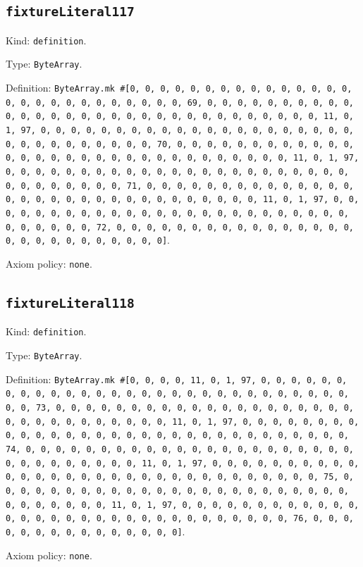 \documentclass[11pt]{article}
\begin{document}
\subsection*{\texttt{fixtureLiteral117}}
\noindent Kind: \texttt{definition}.\par
\noindent Type: \texttt{ByteArray}.\par
\noindent Definition: \texttt{ByteArray.mk \#[0, 0, 0, 0, 0, 0, 0, 0, 0, 0, 0, 0, 0, 0, 0, 0, 0, 0, 0, 0, 0, 0, 0, 0, 0, 0, 0, 69, 0, 0, 0, 0, 0, 0, 0, 0, 0, 0, 0, 0, 0, 0, 0, 0, 0, 0, 0, 0, 0, 0, 0, 0, 0, 0, 0, 0, 0, 0, 0, 11, 0, 1, 97, 0, 0, 0, 0, 0, 0, 0, 0, 0, 0, 0, 0, 0, 0, 0, 0, 0, 0, 0, 0, 0, 0, 0, 0, 0, 0, 0, 0, 0, 0, 0, 70, 0, 0, 0, 0, 0, 0, 0, 0, 0, 0, 0, 0, 0, 0, 0, 0, 0, 0, 0, 0, 0, 0, 0, 0, 0, 0, 0, 0, 0, 0, 0, 11, 0, 1, 97, 0, 0, 0, 0, 0, 0, 0, 0, 0, 0, 0, 0, 0, 0, 0, 0, 0, 0, 0, 0, 0, 0, 0, 0, 0, 0, 0, 0, 0, 0, 0, 71, 0, 0, 0, 0, 0, 0, 0, 0, 0, 0, 0, 0, 0, 0, 0, 0, 0, 0, 0, 0, 0, 0, 0, 0, 0, 0, 0, 0, 0, 0, 0, 11, 0, 1, 97, 0, 0, 0, 0, 0, 0, 0, 0, 0, 0, 0, 0, 0, 0, 0, 0, 0, 0, 0, 0, 0, 0, 0, 0, 0, 0, 0, 0, 0, 0, 0, 72, 0, 0, 0, 0, 0, 0, 0, 0, 0, 0, 0, 0, 0, 0, 0, 0, 0, 0, 0, 0, 0, 0, 0, 0, 0, 0, 0]}.\par
\noindent Axiom policy: \texttt{none}.\par
\subsection*{\texttt{fixtureLiteral118}}
\noindent Kind: \texttt{definition}.\par
\noindent Type: \texttt{ByteArray}.\par
\noindent Definition: \texttt{ByteArray.mk \#[0, 0, 0, 0, 11, 0, 1, 97, 0, 0, 0, 0, 0, 0, 0, 0, 0, 0, 0, 0, 0, 0, 0, 0, 0, 0, 0, 0, 0, 0, 0, 0, 0, 0, 0, 0, 0, 0, 0, 73, 0, 0, 0, 0, 0, 0, 0, 0, 0, 0, 0, 0, 0, 0, 0, 0, 0, 0, 0, 0, 0, 0, 0, 0, 0, 0, 0, 0, 0, 0, 0, 11, 0, 1, 97, 0, 0, 0, 0, 0, 0, 0, 0, 0, 0, 0, 0, 0, 0, 0, 0, 0, 0, 0, 0, 0, 0, 0, 0, 0, 0, 0, 0, 0, 0, 0, 74, 0, 0, 0, 0, 0, 0, 0, 0, 0, 0, 0, 0, 0, 0, 0, 0, 0, 0, 0, 0, 0, 0, 0, 0, 0, 0, 0, 0, 0, 0, 0, 11, 0, 1, 97, 0, 0, 0, 0, 0, 0, 0, 0, 0, 0, 0, 0, 0, 0, 0, 0, 0, 0, 0, 0, 0, 0, 0, 0, 0, 0, 0, 0, 0, 0, 0, 75, 0, 0, 0, 0, 0, 0, 0, 0, 0, 0, 0, 0, 0, 0, 0, 0, 0, 0, 0, 0, 0, 0, 0, 0, 0, 0, 0, 0, 0, 0, 0, 11, 0, 1, 97, 0, 0, 0, 0, 0, 0, 0, 0, 0, 0, 0, 0, 0, 0, 0, 0, 0, 0, 0, 0, 0, 0, 0, 0, 0, 0, 0, 0, 0, 0, 0, 76, 0, 0, 0, 0, 0, 0, 0, 0, 0, 0, 0, 0, 0, 0, 0]}.\par
\noindent Axiom policy: \texttt{none}.\par
\end{document}
